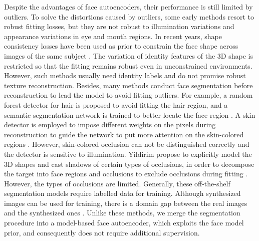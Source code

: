 \documentclass[10pt,twocolumn,letterpaper]{article}
\begin{document}
Despite the advantages of face autoencoders, their performance is still limited by outliers.
To solve the distortions caused by outliers, some early methods \cite{romdhani2003efficient} resort to robust fitting losses, but they are not robust to illumination variations and appearance variations in eye and mouth regions. In recent years, shape consistency losses have been used as prior to constrain the face shape across images of the same subject \cite{deng2019accurate,DECA,Ringnet,tiwari2022occlusion}. The variation of identity features of the 3D shape is restricted so that the fitting remains robust even in unconstrained environments. However, such methods usually need identity labels and do not promise robust texture reconstruction. 
Besides, many methods conduct face segmentation before reconstruction to lead the model to avoid fitting outliers. For example, a random forest detector for hair is proposed \cite{morel2016generative} to avoid fitting the hair region, and a semantic segmentation network is trained to better locate the face region \cite{saito2016real}. A skin detector is employed to impose different weights on the pixels during reconstruction to guide the network to put more attention on the skin-colored regions \cite{deng2019accurate}. However, skin-colored occlusion can not be distinguished correctly and the detector is sensitive to illumination. Yildirim \etal propose to explicitly model the 3D shapes and cast shadows of certain types of occlusions, in order to decompose the target into face regions and occlusions to exclude occlusions during fitting \cite{yildirim2017causal}. However, the types of occlusions are limited.
Generally, these off-the-shelf segmentation models require labelled data for training. Although synthesized images can be used for training, there is a domain gap between the real images and the synthesized ones \cite{kortylewski2018training}. Unlike these methods, we merge the segmentation procedure into a model-based face autoencoder, which exploits the face model prior, and consequently does not require additional supervision.
\end{document}
